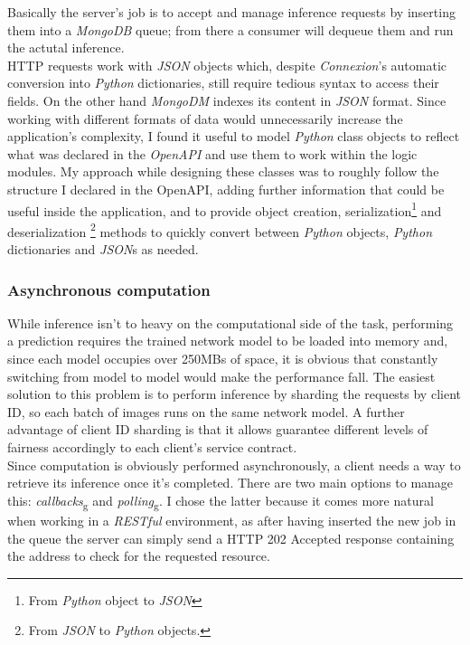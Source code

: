 Basically the server's job is to accept and manage inference requests by inserting them into a \emph{MongoDB} queue; from there a consumer will dequeue them and run the actutal inference. \\
HTTP requests work with \emph{JSON} objects which, despite \emph{Connexion}'s automatic conversion into \emph{Python} dictionaries, still require tedious syntax to access their fields. On the other hand \emph{MongoDM} indexes its content in \emph{JSON} format.
Since working with different formats of data would unnecessarily increase the application's complexity, I found it useful to model \emph{Python} class objects to reflect what was declared in the \emph{OpenAPI} and use them to work within the logic modules. My approach while designing these classes was to roughly follow the structure I declared in the OpenAPI, adding further information that could be useful inside the application, and to provide object creation, serialization\footnote{From \emph{Python} object to \emph{JSON}} and deserialization \footnote{From \emph{JSON} to \emph{Python} objects.} methods to quickly convert between  \emph{Python} objects, \emph{Python} dictionaries and \emph{JSON}s as needed. \\

\subsubsection{Asynchronous computation}
While inference isn't to heavy on the computational side of the task, performing a prediction requires the trained network model to be loaded into memory and, since each model occupies over 250MBs of space, it is obvious that constantly switching from model to model would make the performance fall. The easiest solution to this problem is to perform inference by sharding the requests by client ID, so each batch of images runs on the same network model. A further advantage of client ID sharding is that it allows guarantee different levels of fairness accordingly to each client's service contract. \\
Since computation is obviously performed asynchronously, a client needs a way to retrieve its inference once it's completed. There are two main options to manage this: \emph{\gls{callback}s}\textsubscript{g} and \emph{\gls{polling}}\textsubscript{g}. I chose the latter because it comes more natural when working in a \emph{RESTful} environment, as after having inserted the new job in the queue the server can simply send a HTTP 202 Accepted response containing the address to check for the requested resource.

